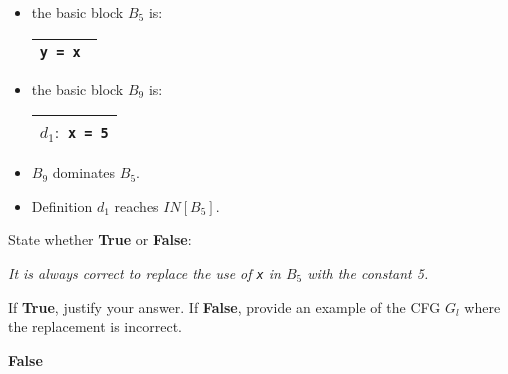 \documentclass[12pt]{article}
\begin{document}
\begin{enumerate}
        \begin{itemize}
          \item the basic block $B_5$ is:
        \renewcommand{\arraystretch}{1}
        \begin{tabular}{|c|}
          \hline
          \lstinline$y = x $\\
          \hline
        \end{tabular}
        \item the basic block $B_9$ is:
        \renewcommand{\arraystretch}{1}
        \begin{tabular}{|c|}
          \hline
          $d_1: $ \lstinline$x = 5$\\
          \hline
        \end{tabular}
        \item $B_9$ dominates $B_5$.
        \item Definition $d_1$ reaches  $IN[B_5]$.
      \end{itemize}
    
            
      State whether \textbf{True} or \textbf{False}: 
    
      \emph{It is always correct to replace the use of \lstinline$x$ in $B_5$ 
      with the constant 5.}
    
      If \textbf{True}, justify your answer.
      If \textbf{False}, provide an example of the CFG $G_l$ where the replacement is incorrect.
      \begin{mdframed}
      \textbf{False} %

\end{mdframed}
\end{enumerate}
\end{document}
